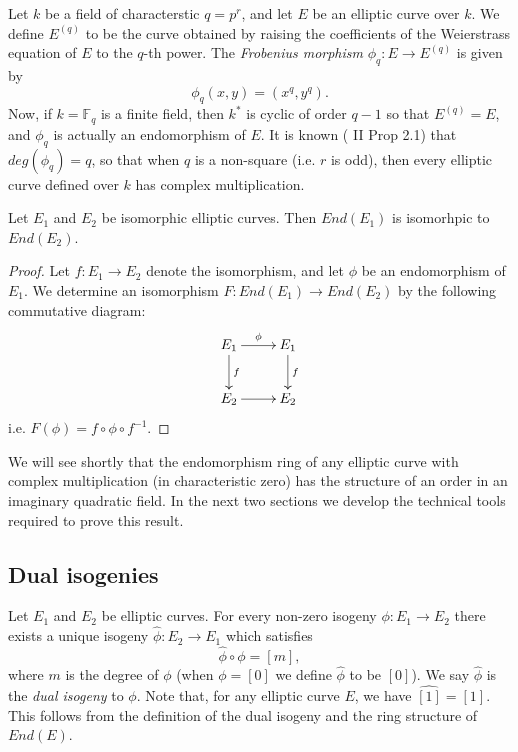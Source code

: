 \begin{example}
  \label{ex:finite-field-cm}
  Let $k$ be a field of characterstic $q = p^{r}$, and let $E$ be an elliptic curve
  over $k$.  We define $E^{(q)}$ to be the curve obtained by raising the coefficients
  of the Weierstrass equation of $E$ to the $q$-th power.  The \emph{Frobenius
    morphism} $\phi_{q} : E \rightarrow E^{(q)}$ is given by
  \begin{equation*}
    \phi_{q}(x,y) = (x^{q},y^{q}).
  \end{equation*}
  Now, if $k = \mathbb{F}_{q}$ is a finite field, then $k^{*}$ is cyclic of order $q
  - 1$ so that $E^{(q)} = E$, and $\phi_{q}$ is actually an endomorphism of $E$.  It
  is known (\cite{silverman86} II Prop 2.1) that $deg(\phi_{q}) = q$, so that when
  $q$ is a non-square (i.e. $r$ is odd), then every elliptic curve defined over $k$
  has complex multiplication.
\end{example}

\begin{prop}
  \label{prop:iso-curves-iso-end-rings}
  Let $E_{1}$ and $E_{2}$ be isomorphic elliptic curves.  Then $End(E_{1})$ is
  isomorhpic to $End(E_{2})$.
\end{prop}
\begin{proof}
  Let $f \colon E_{1} \rightarrow E_{2}$ denote the isomorphism, and let $\phi$ be an
  endomorphism of $E_{1}$. We determine an isomorphism $F \colon End(E_{1}) \rightarrow
  End(E_{2})$ by the following commutative diagram:
\begin{equation*}
\xymatrix{
  E_{1} \ar[d]^{f} \ar[r]^{\phi} & E_{1} \ar[d]^{f} \\
  E_{2} \ar[r] & E_{2}}  
\end{equation*}
i.e. $F(\phi) = f \circ \phi \circ f^{-1}$.
\end{proof}
We will see shortly that the endomorphism ring of any elliptic curve with complex
multiplication (in characteristic zero) has the structure of an order in an imaginary
quadratic field.  In the next two sections we develop the technical tools required to
prove this result.

\subsection{Dual isogenies}
\label{sec:an-interlude-dual}

Let $E_{1}$ and $E_{2}$ be elliptic curves.  For every non-zero isogeny $\phi \colon
E_{1} \rightarrow E_{2}$ there exists a unique isogeny $\hat{\phi} \colon E_{2}
\rightarrow E_{1}$ which satisfies
\begin{equation}
  \label{eq:dual-isogeny}
  \hat{\phi} \circ \phi = \left[ m \right],
\end{equation}
where $m$ is the degree of $\phi$ (when $\phi = \left[ 0 \right]$ we define
$\hat{\phi}$ to be $\left[ 0 \right]$).  We say $\hat{\phi}$ is the \emph{dual
  isogeny} to $\phi$.  Note that, for any elliptic curve $E$, we have $\widehat{[1]}
= [1]$.  This follows from the definition of the dual isogeny and the ring structure
of $End(E)$.

